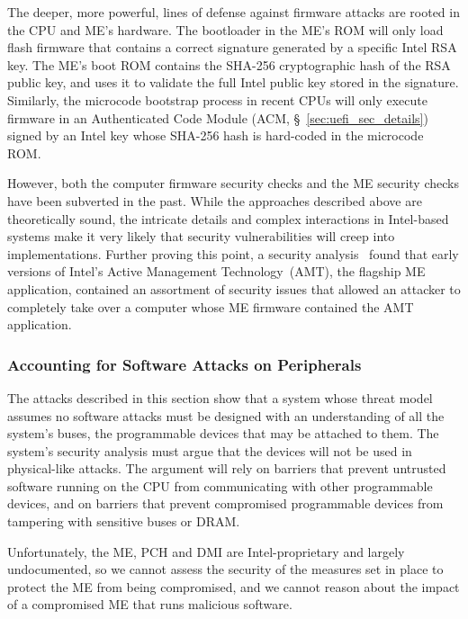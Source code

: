 The deeper, more powerful, lines of defense against firmware attacks are rooted
in the CPU and ME's hardware. The bootloader in the ME's ROM will only load
flash firmware that contains a correct signature generated by a specific Intel
RSA key. The ME's boot ROM contains the SHA-256 cryptographic hash of the RSA
public key, and uses it to validate the full Intel public key stored in the
signature. Similarly, the microcode bootstrap process in recent CPUs will only
execute firmware in an Authenticated Code Module
(ACM, \S~\ref{sec:uefi_sec_details}) signed by an Intel key whose SHA-256 hash
is hard-coded in the microcode ROM.

However, both the computer firmware security checks \cite{wojtczuk2010bios,
furtak2014bios} and the ME security checks \cite{tereshkin2009amt} have been
subverted in the past. While the approaches described above are theoretically
sound, the intricate details and complex interactions in Intel-based systems
make it very likely that security vulnerabilities will creep into
implementations. Further proving this point, a security
analysis~\cite{ververis2010security} found that early versions of Intel's
Active Management Technology~(AMT), the flagship ME application, contained an
assortment of security issues that allowed an attacker to completely take over
a computer whose ME firmware contained the AMT application.


\subsubsection{Accounting for Software Attacks on Peripherals}

The attacks described in this section show that a system whose threat model
assumes no software attacks must be designed with an understanding of all the
system's buses, the programmable devices that may be attached to them. The
system's security analysis must argue that the devices will not be used in
physical-like attacks. The argument will rely on barriers that prevent
untrusted software running on the CPU from communicating with other
programmable devices, and on barriers that prevent compromised programmable
devices from tampering with sensitive buses or DRAM.

Unfortunately, the ME, PCH and DMI are Intel-proprietary and largely
undocumented, so we cannot assess the security of the measures set in place to
protect the ME from being compromised, and we cannot reason about the impact
of a compromised ME that runs malicious software.

